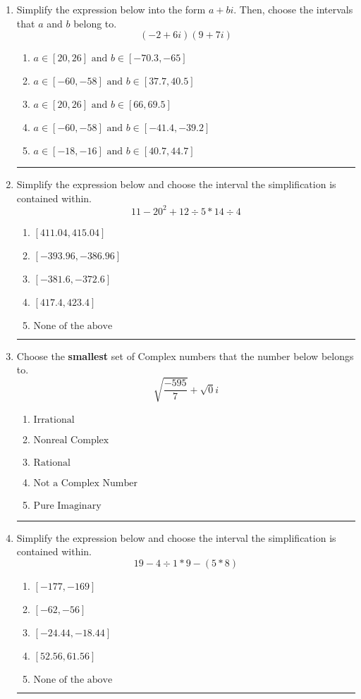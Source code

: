 \documentclass[14pt]{extbook}
\newcommand{\litem}[1]{\item#1\hspace*{-1cm}\rule{\textwidth}{0.4pt}}
\begin{document}
\begin{enumerate}
{\begin{enumerate}[label=\Alph*.]
\end{enumerate} }
\litem{
Simplify the expression below into the form $a+bi$. Then, choose the intervals that $a$ and $b$ belong to.\[ (-2 + 6 i)(9 + 7 i) \]\begin{enumerate}[label=\Alph*.]
\item \( a \in [20, 26] \text{ and } b \in [-70.3, -65] \)
\item \( a \in [-60, -58] \text{ and } b \in [37.7, 40.5] \)
\item \( a \in [20, 26] \text{ and } b \in [66, 69.5] \)
\item \( a \in [-60, -58] \text{ and } b \in [-41.4, -39.2] \)
\item \( a \in [-18, -16] \text{ and } b \in [40.7, 44.7] \)

\end{enumerate} }
\litem{
Simplify the expression below and choose the interval the simplification is contained within.\[ 11 - 20^2 + 12 \div 5 * 14 \div 4 \]\begin{enumerate}[label=\Alph*.]
\item \( [411.04, 415.04] \)
\item \( [-393.96, -386.96] \)
\item \( [-381.6, -372.6] \)
\item \( [417.4, 423.4] \)
\item \( \text{None of the above} \)

\end{enumerate} }
\litem{
Choose the \textbf{smallest} set of Complex numbers that the number below belongs to.\[ \sqrt{\frac{-595}{7}}+\sqrt{0}i \]\begin{enumerate}[label=\Alph*.]
\item \( \text{Irrational} \)
\item \( \text{Nonreal Complex} \)
\item \( \text{Rational} \)
\item \( \text{Not a Complex Number} \)
\item \( \text{Pure Imaginary} \)

\end{enumerate} }
\litem{
Simplify the expression below and choose the interval the simplification is contained within.\[ 19 - 4 \div 1 * 9 - (5 * 8) \]\begin{enumerate}[label=\Alph*.]
\item \( [-177, -169] \)
\item \( [-62, -56] \)
\item \( [-24.44, -18.44] \)
\item \( [52.56, 61.56] \)
\item \( \text{None of the above} \)


\end{enumerate}}
\end{enumerate}
\end{document}
